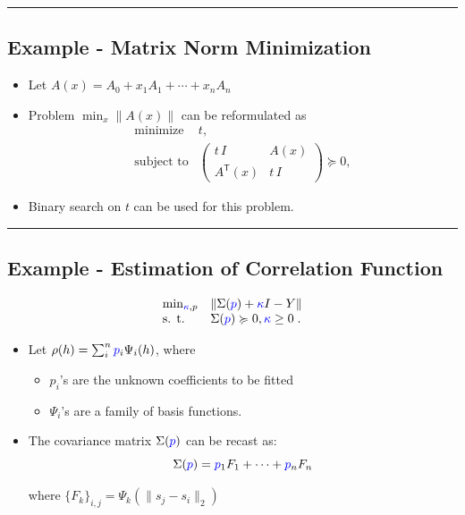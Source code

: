 \documentclass[
]{article}
\providecommand{\tightlist}{%
  \setlength{\itemsep}{0pt}\setlength{\parskip}{0pt}}
\begin{document}
\begin{center}\rule{0.5\linewidth}{0.5pt}\end{center}

\subsection{Example - Matrix Norm
Minimization}\label{example---matrix-norm-minimization}

\begin{itemize}
\tightlist
\item
  Let \(A(x) = A_0 + x_1 A_1 + \cdots + x_n A_n\)
\item
  Problem \(\min_x \| A(x) \|\) can be reformulated as
  \[\begin{array}{ll}
       \text{minimize}      & t, \\
       \text{subject to}    & \left(
   \begin{array}{cc}
    t\,I   & A(x) \\
    A^\mathsf{T}(x) & t\,I
   \end{array} \right) \succeq 0,
   \end{array}\]
\item
  Binary search on \(t\) can be used for this problem.
\end{itemize}

\begin{center}\rule{0.5\linewidth}{0.5pt}\end{center}

\subsection{Example - Estimation of Correlation
Function}\label{example---estimation-of-correlation-function}

\[\begin{array}{ll}
   \min_{{\color{blue}\kappa}, p}   & \| \Sigma({\color{blue}p}) + {\color{blue}\kappa} I - Y \| \\
   \text{s. t.} & \Sigma({\color{blue}p}) \succcurlyeq 0,  {\color{blue}\kappa} \geq 0 \; .\\
 \end{array}\]

\begin{itemize}
\item
  Let \(\rho(h) = \sum_i^n {\color{blue}p}_i \Psi_i(h)\), where

  \begin{itemize}
  \tightlist
  \item
    \(p_i\)'s are the unknown coefficients to be fitted
  \item
    \(\Psi_i\)'s are a family of basis functions.
  \end{itemize}
\item
  The covariance matrix \(\Sigma({\color{blue}p})\) can be recast as:
  \[\Sigma({\color{blue}p}) = {\color{blue}p}_1 F_1 + \cdots + {\color{blue}p}_n F_n\]

  where \(\{F_k\}_{i,j} =\Psi_k( \| s_j - s_i \|_2)\)
\end{itemize}
\end{document}
